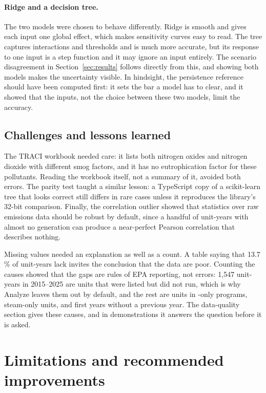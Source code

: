 \documentclass[11pt,a4paper]{article}
\begin{document}
\paragraph{Ridge and a decision tree.} The two models were chosen to behave differently. Ridge
is smooth and gives each input one global effect, which makes sensitivity curves easy to read.
The tree captures interactions and thresholds and is much more accurate, but its response to one
input is a step function and it may ignore an input entirely. The scenario disagreement in
Section~\ref{sec:results} follows directly from this, and showing both models makes the
uncertainty visible. In hindsight, the persistence reference should have been computed first:
it sets the bar a model has to clear, and it showed that the inputs, not the choice between
these two models, limit the accuracy.

\subsection{Challenges and lessons learned}

The TRACI workbook needed care: it lists both nitrogen oxides and nitrogen dioxide with
different smog factors, and it has no eutrophication factor for these pollutants.
Reading the workbook itself, not a summary of it, avoided both errors. The parity test taught a
similar lesson: a TypeScript copy of a scikit-learn tree that looks correct still differs in
rare cases unless it reproduces the library's 32-bit comparison. Finally, the correlation
outlier showed that statistics over raw emissions data should be robust by default, since a
handful of unit-years with almost no generation can produce a near-perfect Pearson correlation
that describes nothing.

Missing values needed an explanation as well as a count. A table saying that 13.7\,\% of
unit-years lack \COtwo{} invites the conclusion that the data are poor. Counting the causes showed
that the gaps are rules of EPA reporting, not errors: 1{,}547 unit-years in 2015--2025 are units
that were listed but did not run, which is why Analyze leaves them out by default, and the
rest are units in \NOx{}-only programs, steam-only units, and first years without a previous year.
The data-quality section gives these causes, and in demonstrations it answers the question
before it is asked.

\section{Limitations and recommended improvements}
\label{sec:limitations}
\end{document}
